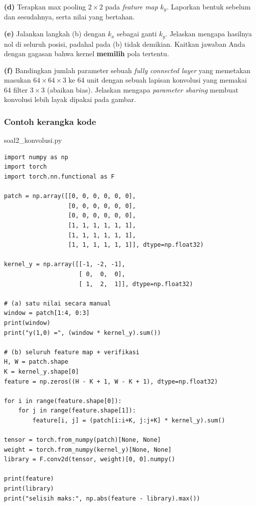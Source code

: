 \documentclass[12pt, a4paper]{article}
\begin{document}
\textbf{(d)} Terapkan max pooling $2 \times 2$ pada \emph{feature map} $k_y$. Laporkan bentuk sebelum dan sesudahnya, serta nilai yang bertahan.

\textbf{(e)} Jalankan langkah (b) dengan $k_x$ sebagai ganti $k_y$. Jelaskan mengapa hasilnya nol di seluruh posisi, padahal pada (b) tidak demikian. Kaitkan jawaban Anda dengan gagasan bahwa kernel \textbf{memilih} pola tertentu.

\textbf{(f)} Bandingkan jumlah parameter sebuah \emph{fully connected layer} yang memetakan masukan $64 \times 64 \times 3$ ke 64 unit dengan sebuah lapisan konvolusi yang memakai 64 filter $3 \times 3$ (abaikan bias). Jelaskan mengapa \emph{parameter sharing} membuat konvolusi lebih layak dipakai pada gambar.

\subsubsection{Contoh kerangka kode}
\label{sec:soal2-kode}

\begin{codewindow}{soal2\_konvolusi.py}
\begin{lstlisting}[style=pycode]
import numpy as np
import torch
import torch.nn.functional as F

patch = np.array([[0, 0, 0, 0, 0, 0],
                  [0, 0, 0, 0, 0, 0],
                  [0, 0, 0, 0, 0, 0],
                  [1, 1, 1, 1, 1, 1],
                  [1, 1, 1, 1, 1, 1],
                  [1, 1, 1, 1, 1, 1]], dtype=np.float32)

kernel_y = np.array([[-1, -2, -1],
                     [ 0,  0,  0],
                     [ 1,  2,  1]], dtype=np.float32)

# (a) satu nilai secara manual
window = patch[1:4, 0:3]
print(window)
print("y(1,0) =", (window * kernel_y).sum())

# (b) seluruh feature map + verifikasi
H, W = patch.shape
K = kernel_y.shape[0]
feature = np.zeros((H - K + 1, W - K + 1), dtype=np.float32)

for i in range(feature.shape[0]):
    for j in range(feature.shape[1]):
        feature[i, j] = (patch[i:i+K, j:j+K] * kernel_y).sum()

tensor = torch.from_numpy(patch)[None, None]
weight = torch.from_numpy(kernel_y)[None, None]
library = F.conv2d(tensor, weight)[0, 0].numpy()

print(feature)
print(library)
print("selisih maks:", np.abs(feature - library).max())
\end{lstlisting}
\end{codewindow}
\end{document}
